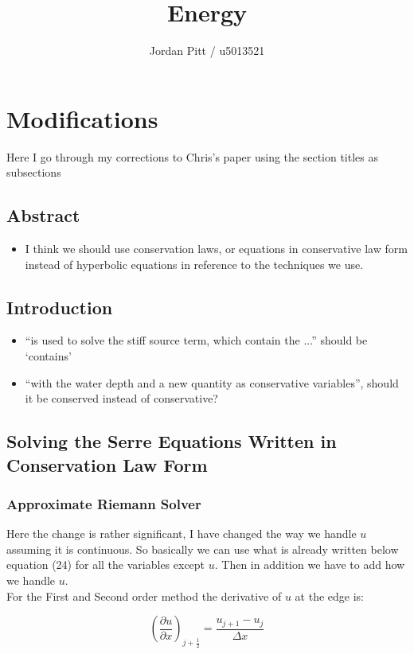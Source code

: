 \documentclass[12pt]{article}
\begin{document}
\title{Energy}
\author{Jordan Pitt / u5013521}

\section{Modifications}
Here I go through my corrections to Chris's paper using the section titles as subsections

\subsection{Abstract}
\begin{itemize}
\item I think we should use conservation laws, or equations in conservative law form instead of hyperbolic equations in reference to the techniques we use.
\end{itemize}


\subsection{Introduction}
\begin{itemize}
\item ``is used to solve the stiff source term, which contain the ...'' should be `contains'
\item ``with the water depth and a new quantity as conservative variables'', should it be conserved instead of conservative?

\end{itemize}

\subsection{Solving the Serre Equations Written in Conservation Law Form}
\subsubsection{Approximate Riemann Solver}
Here the change is rather significant, I have changed the way we handle $u$ assuming it is continuous. So basically we can use what is already written below equation (24) for all the variables except $u$. Then in addition we have to add how we handle $u$. \\
For the First and Second order method the derivative of $u$ at the edge is:

\[ \left(\frac{\partial u}{\partial x}\right)_{j + \frac{1}{2}} = \frac{u_{j+1} - u_{j}}{\Delta x}\]
\end{document}

